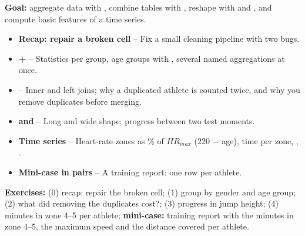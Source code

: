 \textbf{Goal:} aggregate data with , combine tables with
, reshape with  and , and compute
basic features of a time series.

\begin{itemize}
  \item \textbf{Recap: repair a broken cell} -- Fix a small cleaning pipeline with two bugs.
  \item \textbf{ + } -- Statistics per group, age groups with , several named aggregations at once.
  \item \textbf{} -- Inner and left joins; why a duplicated athlete is counted twice, and why you remove duplicates before merging.
  \item \textbf{ and } -- Long and wide shape; progress between two test moments.
  \item \textbf{Time series} -- Heart-rate zones as \% of $HR_{max}$ (220 $-$ age), time per zone, , .
  \item \textbf{Mini-case in pairs} -- A training report: one row per athlete.
\end{itemize}

\textbf{Exercises:} (0) recap: repair the broken cell; (1) group by
gender and age group; (2) what did removing the duplicates cost?;
(3) progress in jump height; (4) minutes in zone 4--5 per athlete;
\textbf{mini-case:} training report with the minutes in zone 4--5, the
maximum speed and the distance covered per athlete.
